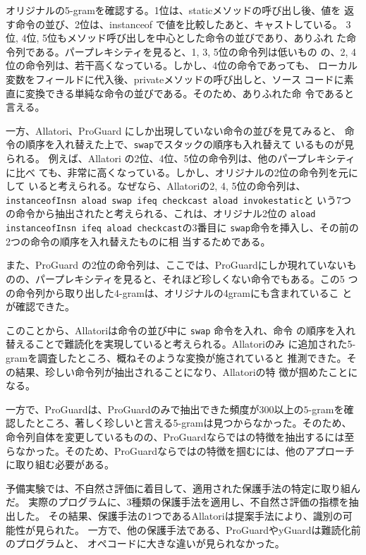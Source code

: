 \documentclass[12pt,twoside]{jreport}
\begin{document}
オリジナルの5-gramを確認する。1位は、staticメソッドの呼び出し後、値を
返す命令の並び、2位は、instanceof で値を比較したあと、キャストしている。
3位, 4位, 5位もメソッド呼び出しを中心とした命令の並びであり、ありふれ
た命令列である。パープレキシティを見ると、1, 3, 5位の命令列は低いもの
の、2, 4位の命令列は、若干高くなっている。しかし、4位の命令であっても、
ローカル変数をフィールドに代入後、privateメソッドの呼び出しと、ソース
コードに素直に変換できる単純な命令の並びである。そのため、ありふれた命
令であると言える。

一方、Allatori、ProGuard にしか出現していない命令の並びを見てみると、
命令の順序を入れ替えた上で、\texttt{swap}でスタックの順序も入れ替えて
いるものが見られる。
%
例えば、Allatori の2位、4位、5位の命令列は、他のパープレキシティに比べ
ても、非常に高くなっている。しかし、オリジナルの2位の命令列を元にして
いると考えられる。なぜなら、Allatoriの2, 4, 5位の命令列は、
\texttt{instanceofInsn aload swap ifeq checkcast aload invokestatic}と
いう7つの命令から抽出されたと考えられる、これは、オリジナル2位の
\texttt{aload instanceofInsn ifeq aload checkcast}の3番目に
\texttt{swap}命令を挿入し、その前の2つの命令の順序を入れ替えたものに相
当するためである。

また、ProGuard の2位の命令列は、ここでは、ProGuardにしか現れていないも
のの、パープレキシティを見ると、それほど珍しくない命令でもある。この5
つの命令列から取り出した4-gramは、オリジナルの4gramにも含まれているこ
とが確認できた。

このことから、Allatoriは命令の並び中に \texttt{swap} 命令を入れ、命令
の順序を入れ替えることで難読化を実現していると考えられる。Allatoriのみ
に追加された5-gramを調査したところ、概ねそのような変換が施されていると
推測できた。その結果、珍しい命令列が抽出されることになり、Allatoriの特
徴が掴めたことになる。

一方で、ProGuardは、ProGuardのみで抽出できた頻度が300以上の$5$-gramを確
認したところ、著しく珍しいと言える5-gramは見つからなかった。そのため、
命令列自体を変更しているものの、ProGuardならではの特徴を抽出するには至
らなかった。そのため、ProGuardならではの特徴を掴むには、他のアプローチ
に取り組む必要がある。

予備実験では、不自然さ評価に着目して、適用された保護手法の特定に取り組んだ。
実際のプログラムに、3種類の保護手法を適用し、不自然さ評価の指標を抽出した。
その結果、保護手法の1つであるAllatoriは提案手法により、識別の可能性が見られた。
一方で、他の保護手法である、ProGuardやyGuardは難読化前のプログラムと、
オペコードに大きな違いが見られなかった。
\end{document}

